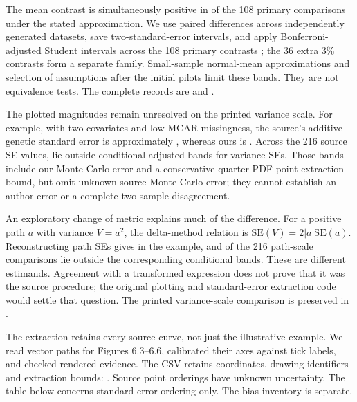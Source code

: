 The mean contrast is simultaneously positive in \PositiveBands{} of the 108 primary comparisons under the stated approximation. We use paired differences across independently generated datasets, save two-standard-error intervals, and apply Bonferroni-adjusted Student intervals across the 108 primary contrasts \citep{dunn1961}; the 36 extra 3\% contrasts form a separate family. Small-sample normal-mean approximations and selection of assumptions after the initial pilots limit these bands. They are not equivalence tests. The complete records are  and .

The plotted magnitudes remain unresolved on the printed variance scale. For example, with two covariates and low MCAR missingness, the source's additive-genetic standard error is approximately \SourceAse{}, whereas ours is \OursAse{}. Across the 216 source SE values, \VarianceOutside{} lie outside conditional adjusted bands for variance SEs. Those bands include our Monte Carlo error and a conservative quarter-PDF-point extraction bound, but omit unknown source Monte Carlo error; they cannot establish an author error or a complete two-sample disagreement.

An exploratory change of metric explains much of the difference. For a positive path $a$ with variance $V=a^2$, the delta-method relation is $\mathrm{SE}(V)=2|a|\mathrm{SE}(a)$. Reconstructing path SEs gives \PathAse{} in the example, and \PathOutside{} of the 216 path-scale comparisons lie outside the corresponding conditional bands. These are different estimands. Agreement with a transformed expression does not prove that it was the source procedure; the original plotting and standard-error extraction code would settle that question. The printed variance-scale comparison is preserved in .

The extraction retains every source curve, not just the illustrative example. We read vector paths for Figures 6.3--6.6, calibrated their axes against tick labels, and checked rendered evidence. The CSV retains coordinates, drawing identifiers and extraction bounds: . Source point orderings have unknown uncertainty. The table below concerns standard-error ordering only. The bias inventory is separate.
{\small}

